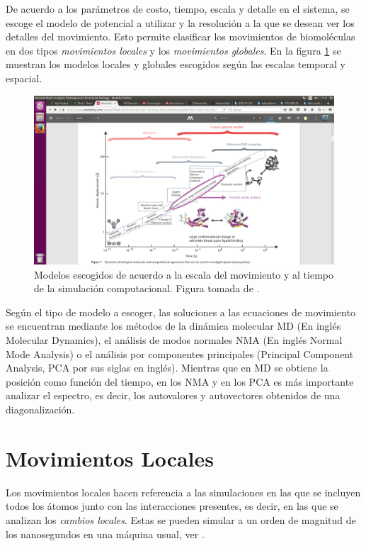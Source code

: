De acuerdo a los par\'{a}metros de costo, tiempo, escala y detalle en el sistema, se escoge el modelo de potencial a utilizar y la resoluci\'{o}n a la que se desean ver los detalles del movimiento. Esto permite clasificar los movimientos de biomol\'{e}culas en dos tipos \textit{movimientos locales} y los \textit{movimientos globales}. En la figura \ref{fig:esc} se muestran los modelos locales y globales escogidos seg\'{u}n las escalas temporal y espacial.\\
\begin{figure}[h]
\centering%
\includegraphics[trim={10cm 1cm 8cm 10cm},clip,scale=0.3]{Kap2/escalas.png}%
\caption{Modelos escogidos de acuerdo a la escala del movimiento y al tiempo de la simulaci\'{o}n computacional. Figura tomada de  \cite{Ramon}.} \label{fig:esc}
\end{figure}


Seg\'{u}n el tipo de modelo a escoger, las soluciones a las ecuaciones de movimiento se encuentran mediante los m\'{e}todos de la din\'{a}mica molecular MD (En ingl\'{e}s Molecular Dynamics), el an\'{a}lisis de modos normales NMA (En ingl\'{e}s Normal Mode Analysis) o el an\'{a}lisis por componentes principales (Principal Component Analysis, PCA por sus siglas en ingl\'{e}s). Mientras que en MD se obtiene la posici\'{o}n como funci\'{o}n del tiempo, en los NMA y en los PCA  es m\'{a}s importante analizar el espectro, es decir, los autovalores y autovectores obtenidos de una diagonalizaci\'{o}n.\\

\section{Movimientos Locales}
Los movimientos locales hacen referencia a las simulaciones en las que se incluyen todos los \'{a}tomos junto con las interacciones presentes, es decir, en las que se analizan los \textit{cambios locales}. Estas se pueden simular a un orden de magnitud de los nanosegundos en una m\'{a}quina usual, ver \cite{Gur2013}.\\
